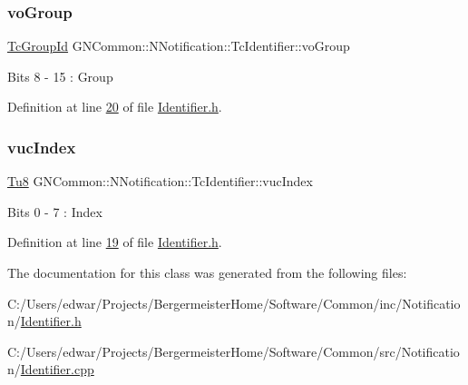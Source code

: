 \mbox{\label{class_g_n_common_1_1_n_notification_1_1_tc_identifier_afcf493852b92439dca37c671b549c2d3}} 
\subsubsection{\texorpdfstring{vo\+Group}{voGroup}}
{\footnotesize\ttfamily \mbox{\hyperlink{namespace_g_n_common_1_1_n_notification_af29017ad6ed59156beabc385a91db18e}{Tc\+Group\+Id}} G\+N\+Common\+::\+N\+Notification\+::\+Tc\+Identifier\+::vo\+Group}

Bits 8 -\/ 15 \+: Group 

Definition at line \mbox{\hyperlink{_identifier_8h_source_l00020}{20}} of file \mbox{\hyperlink{_identifier_8h_source}{Identifier.\+h}}.

\mbox{\label{class_g_n_common_1_1_n_notification_1_1_tc_identifier_a704ac106036ca2d6b4fae77be75e7913}} 
\subsubsection{\texorpdfstring{vuc\+Index}{vucIndex}}
{\footnotesize\ttfamily \mbox{\hyperlink{namespace_g_n_common_a7939e251ddbf5d3a31832dcfdc8bde39}{Tu8}} G\+N\+Common\+::\+N\+Notification\+::\+Tc\+Identifier\+::vuc\+Index}

Bits 0 -\/ 7 \+: Index 

Definition at line \mbox{\hyperlink{_identifier_8h_source_l00019}{19}} of file \mbox{\hyperlink{_identifier_8h_source}{Identifier.\+h}}.



The documentation for this class was generated from the following files\+:\begin{DoxyCompactItemize}
\item 
C\+:/\+Users/edwar/\+Projects/\+Bergermeister\+Home/\+Software/\+Common/inc/\+Notification/\mbox{\hyperlink{_identifier_8h}{Identifier.\+h}}\item 
C\+:/\+Users/edwar/\+Projects/\+Bergermeister\+Home/\+Software/\+Common/src/\+Notification/\mbox{\hyperlink{_identifier_8cpp}{Identifier.\+cpp}}\end{DoxyCompactItemize}
